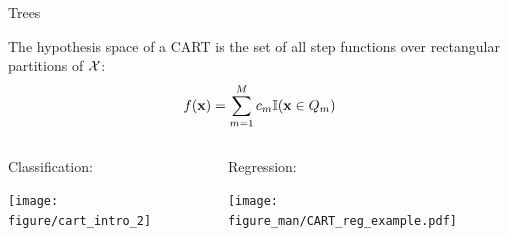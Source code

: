 \documentclass[11pt,compress,t,notes=noshow, xcolor=table]{beamer}
\begin{document}
\begin{frame}[fragile]{Trees}

The hypothesis space of a CART is the set of all step functions over rectangular partitions of $\mathcal{X}$:
\begin{align*}
    f(\mathbf{x}) = \sum_{m=1}^M c_m \mathbb{I}(\mathbf{x} \in Q_m)
\end{align*}

\begin{columns}
\begin{column}{0.5\textwidth}
Classification:
\lz
\begin{knitrout}\scriptsize
{}\color{fgcolor}

{\centering \texttt{[image: figure/cart\_intro\_2]} 

}



\end{knitrout}
 
\end{column}
\begin{column}{0.5\textwidth}
Regression:

\texttt{[image: figure\_man/CART\_reg\_example.pdf]}

\end{column}
\end{columns}
\end{frame}










\endlecture
\end{document}
